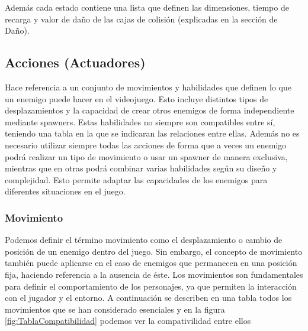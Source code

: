 Además cada estado contiene una lista que definen las dimensiones, tiempo de recarga y valor de daño de las cajas de colisión (explicadas en la sección de Daño).

\subsection{Acciones (Actuadores)}
Hace referencia a un conjunto de movimientos y habilidades que definen lo que un enemigo puede hacer en el videojuego. Esto incluye distintos tipos de desplazamientos y la capacidad de crear otros enemigos de forma independiente mediante spawners. Estas habilidades no siempre son compatibles entre sí, teniendo una tabla en la que se indicaran las relaciones entre ellas. Además no es necesario utilizar siempre todas las acciones de forma que a veces un enemigo podrá realizar un tipo de movimiento o usar un spawner de manera exclusiva, mientras que en otras podrá combinar varias habilidades según su diseño y complejidad. Esto permite adaptar las capacidades de los enemigos para diferentes situaciones en el juego.

\subsubsection{Movimiento}
Podemos definir el término movimiento como el desplazamiento o cambio de posición de un enemigo dentro del juego. Sin embargo, el concepto de movimiento también puede aplicarse en el caso de enemigos que permanecen en una posición fija, haciendo referencia a la ausencia de éste. Los movimientos son fundamentales para definir el comportamiento de los personajes, ya que permiten la interacción con el jugador y el entorno.
A continuación se describen en una tabla todos los movimientos que se han considerado esenciales y en la figura \ref{fig:TablaCompatibilidad} podemos ver la compativilidad entre ellos


